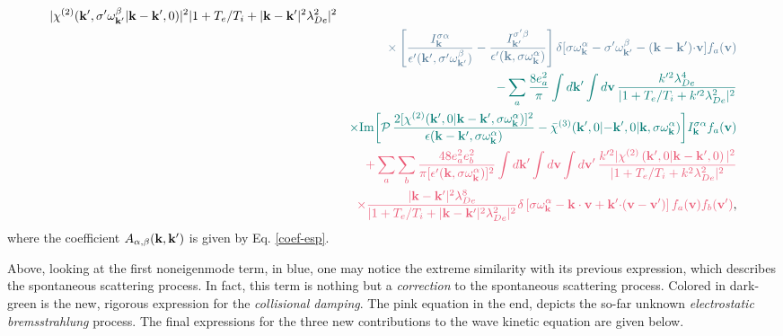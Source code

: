 \documentclass[12pt,a4paper,ruledheader]{report}
\begin{document}
\begin{eqnarray}
{{       |\chi^{(2)}({\bf k'},\sigma '\omega_{\bf k'}^\beta|{\bf k-k'},0)|^2}
    {|1+T_e/T_i+|{\bf k-k'}|^2 \lambda_{De}^2|^2}}
    \nonumber\\
    &&\textcolor{darkblue}{\times \left[ \frac{I_{\bf k}^{\sigma \alpha}}
      {\epsilon '({\bf k'},\sigma '\omega_{\bf k'}^\beta)}
      -\frac{I_{\bf k'}^{\sigma '\beta}}
	{\epsilon '({\bf k},\sigma \omega_{\bf k}^\alpha)}\right] 
    \delta[\sigma\omega_{\bf k}^\alpha-\sigma '\omega_{\bf k'}^\beta
    -({\bf k-k'}){\bf \cdot v}]f_a({\bf v})}
	 \nonumber\\
      &&\textcolor{skobeloff}{-\sum_a \frac{8 e_a^2}{\pi}
	 \int d{\bf k '}\int d{\bf v}\,
	 \frac{k'^2\lambda_{De}^4}{|1+T_e/T_i+k'^2\lambda_{De}^2|^2}}
	 \nonumber\\
    &&\textcolor{skobeloff}{
     \times\mbox{Im}\biggl[ \mathcal{P}\,
    \frac{2[\chi^{(2)}({\bf k'},0|{\bf k-k'},\sigma\omega_{\bf k}^\alpha)]^2}
    {\epsilon({\bf k-k'},\sigma \omega_{\bf k}^\alpha)}
       -\bar \chi^{(3)}({\bf k'},0|{\bf -k'},0|{\bf k},\sigma\omega_{\bf k}^\alpha)\biggr]
       I_{\bf k}^{\sigma \alpha}f_a({\bf v})}
      \nonumber\\
 &&\textcolor{softred}{+\sum_a\sum_b
     \frac{48 e_a^2 e_b^2}{\pi[\epsilon '({\bf k},\sigma\omega_{\bf k}^\alpha)]^2}
     \int d{\bf k '} \int d{\bf v} \int d{\bf v'}\,
     \frac{k'^2|\chi^{(2)} \left( {\bf k'},0|{\bf k-k'},0 \right)|^2}
     {|1+T_e/T_i+k^2 \lambda_{De}^2|^2}}
    \nonumber\\
  &&\textcolor{softred}{\times \frac{|{\bf k-k'}|^2\lambda_{De}^8}
     {|1+T_e/T_i+|{\bf k-k'}|^2 \lambda_{De}^2|^2} 
     \delta \left[ \sigma\omega_{\bf k}^\alpha-{\bf k \cdot v}
	+{\bf k' \cdot}({\bf v-v'})\right] f_a({\bf v}) f_b({\bf v'})},
       \label{wave-gen}
\end{eqnarray}
where the coefficient $A_{\alpha,\beta}({\bf k},{\bf k'})$ is given by
Eq. \eqref{coef-esp}.

Above, looking at the first noneigenmode term, in blue, one may notice
the extreme similarity with its previous expression, which describes the
spontaneous scattering process. In fact, this term is nothing but a
\emph{correction} to the spontaneous scattering process. Colored in
dark-green is the new, rigorous expression for the \emph{collisional
  damping}. The pink equation in the end, depicts the so-far unknown
\emph{electrostatic bremsstrahlung} process. The final expressions for
the three new contributions to the wave kinetic equation are given below.
\end{document}
